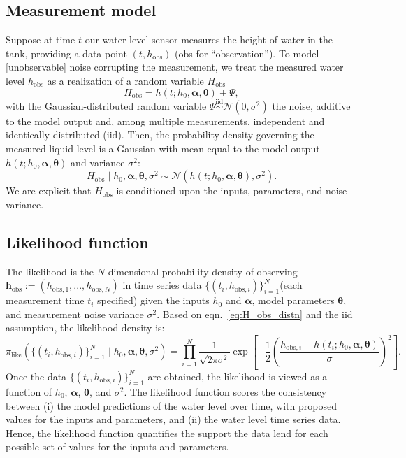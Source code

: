 \documentclass[openacc]{rsproca_new}%
\newcommand\thedata {$\{(t_i,h_{\text{obs}, i})\}_{i=1}^{N}$\xspace}
\newcommand\thedatanomath {\{(t_i,h_{\text{obs}, i})\}_{i=1}^{N}}
\newcommand\themodel {$h(t; h_0, \boldsymbol \alpha, \boldsymbol\theta)$\xspace}
\newcommand\themodelnomath {h(t; h_0, \boldsymbol \alpha, \boldsymbol\theta)}
\begin{document}
\subsection{Measurement model}
Suppose at time $t$ our water level sensor measures the height of water in the tank, providing a data point $(t, h_{\text{obs}})$ (obs for ``observation''). 
To model [unobservable] noise corrupting the measurement, we treat the measured water level $h_{\text{obs}}$ as a realization of a random variable $H_{\text{obs}}$
\begin{equation}
	H_{\text{obs}} = \themodelnomath + \Psi,
\end{equation}
with the Gaussian-distributed random variable $\Psi \overset{\text{iid}}{\sim} \mathcal{N}(0, \sigma^2)$ the noise, additive to the model output and, among multiple measurements, independent and identically-distributed (iid). 
Then, the probability density governing the measured liquid level is a Gaussian with mean equal to the model output \themodel and variance $\sigma^2$:
\begin{equation}
	H_{\text{obs}} \mid h_0, \boldsymbol \alpha, \boldsymbol  \theta, \sigma^2 \sim \mathcal{N}(\themodelnomath, \sigma^2). \label{eq:H_obs_distn}
\end{equation} We are explicit that $H_{\text{obs}}$ is conditioned upon the inputs, parameters, and noise variance.


\subsection{Likelihood function}
The likelihood is the $N$-dimensional probability density of observing $\mathbf{h}_\text{obs}:=(h_{\text{obs},1}, ..., h_{\text{obs},N})$ in time series data \thedata (each measurement time $t_i$ specified) given the inputs $h_0$ and $\boldsymbol \alpha$, model parameters $\boldsymbol \theta$, and measurement noise variance $\sigma^2$. 
Based on eqn.~\ref{eq:H_obs_distn} and the iid assumption, the likelihood density is:
\begin{equation}
 \pi_{\text{like}}(\thedatanomath \mid h_0,\boldsymbol  \alpha, \boldsymbol \theta, \sigma^2 ) = \prod_{i=1}^N \frac{1}{\sqrt{2\pi\sigma^2}} \exp \left[-\frac{1}{2}\left(\frac{h_{\text{obs}, i} - h(t_i; h_0, \boldsymbol\alpha, \boldsymbol\theta)}{\sigma} \right)^2 \right]. \label{eq:like}
\end{equation}
Once the data \thedata are obtained, the likelihood is viewed as a function of $h_0$, $\boldsymbol \alpha$, $\boldsymbol \theta$, and $\sigma^2$. The likelihood function scores the consistency between (i) the model predictions of the water level over time, with proposed values for the inputs and parameters, and (ii) the water level time series data. Hence, the likelihood function quantifies the support the data lend for each possible set of values for the inputs and parameters. 
\end{document}
